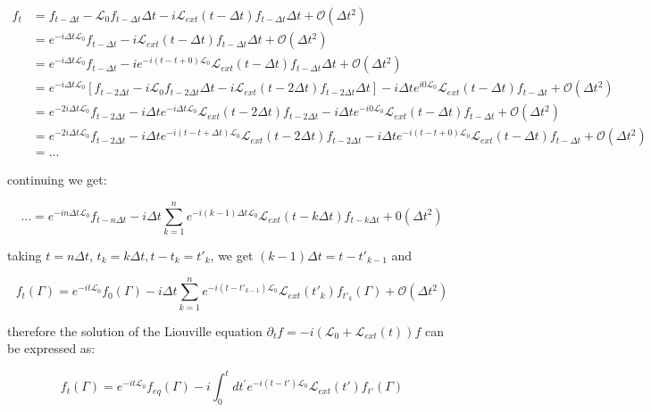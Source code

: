 \documentclass{article}
\begin{document}
\begin{align*}
f_t&= f_{t-\Delta t} - \mathcal{L}_0 f_{t-\Delta t} \Delta t -  i \mathcal{L}_{ext}(t-\Delta t) f_{t-\Delta t} \Delta t + \mathcal{O}(\Delta t^2)\\
&=e^{-i \Delta t \mathcal{L}_0}  f_{t-\Delta t}  - i \mathcal{L}_{ext}(t-\Delta t) f_{t-\Delta t} \Delta t + \mathcal{O}(\Delta t^2) \\
&= e^{-i \Delta t \mathcal{L}_0}  f_{t-\Delta t}  -i e^{-i(t-t+0) \mathcal{L}_0} \mathcal{L}_{ext}(t-\Delta t) f_{t-\Delta t} \Delta t + \mathcal{O}(\Delta t^2) \\
&= e^{-i \Delta t \mathcal{L}_0}  [f_{t- 2\Delta t} - i \mathcal{L}_0 f_{t- 2\Delta t} \Delta t - i \mathcal{L}_{ext}(t- 2\Delta t) f_{t- 2\Delta t} \Delta t ] - i \Delta t e^{i 0 \mathcal{L}_0} \mathcal{L}_{ext}(t-\Delta t) f_{t-\Delta t} + \mathcal{O}(\Delta t^2)\\
&= e^{- 2i \Delta t \mathcal{L}_0} f_{t- 2 \Delta t} - i  \Delta t e^{-i \Delta t \mathcal{L}_0} \mathcal{L}_{ext}(t-2\Delta t) f_{t-2 \Delta t} - i \Delta t e^{- i 0 \mathcal{L}_0} \mathcal{L}_{ext}(t-\Delta t) f_{t - \Delta t} + \mathcal{O}(\Delta t^2) \\
&= e^{- 2i \Delta t \mathcal{L}_0} f_{t- 2 \Delta t} - i  \Delta t e^{-i(t-t + \Delta t )\mathcal{L}_0} \mathcal{L}_{ext}(t-2\Delta t) f_{t-2 \Delta t} - i \Delta t e^{- i (t-t+0) \mathcal{L}_0} \mathcal{L}_{ext}(t-\Delta t) f_{t - \Delta t} + \mathcal{O}(\Delta t^2) \\
& = ...
\end{align*}

continuing we get:

$$ ... = e^{-i n \Delta t \mathcal{L}_0} f_{t - n\Delta t} - i \Delta t \sum_{k=1}^{n} e^{-i(k-1) \Delta t \mathcal{L}_0 } \mathcal{L}_{ext}(t-k \Delta t) f_{t-k \Delta t} + \mathcal{0}(\Delta t^2) $$

taking $t = n \Delta t$, $t_k = k \Delta t, t-t_k = {t'}_k$, we get $(k-1)\Delta t= t - {t'}_{k-1}$ and

$$f_t(\Gamma) = e^{-i t \mathcal{L}_0} f_0(\Gamma) - i \Delta t \sum_{k=1}^{n} e^{-i (t-{t'}_{k-1}) \mathcal{L}_0 } \mathcal{L}_{ext}({t'}_k) f_{{t'}_k}(\Gamma) + \mathcal{O}(\Delta t^2) $$


therefore the solution of the Liouville equation $\partial_t f = -i(\mathcal{L}_0 + \mathcal{L}_ {ext}(t)) f$ can be expressed as:

$$ f_t(\Gamma) = e^{-i t \mathcal{L}_0} f_{eq}(\Gamma) - i \int_{0}^{t} dt^{'} e^{-i(t-t') \mathcal{L}_0} \mathcal{L}_{ext}(t') f_{t'}(\Gamma)$$
\end{document}

